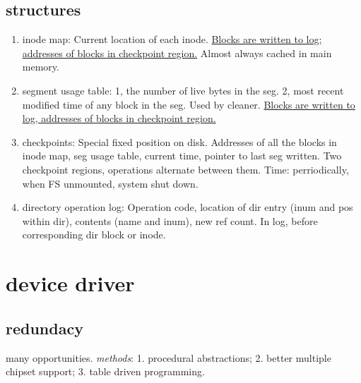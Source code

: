 \documentclass[9pt,conference]{IEEEtran}
\begin{document}
\subsection{structures}
\label{sec-6-1}
\begin{enumerate}
\item inode map:
\label{sec-6-1-1}
Current location of each inode.
\uline{Blocks are written to log; addresses of blocks in checkpoint region.}
Almost always cached in main memory.
\item segment usage table:
\label{sec-6-1-2}
1, the number of live bytes in the seg.
2, most recent modified time of any block in the seg.
Used by cleaner.
\uline{Blocks are written to log, addresses of blocks in checkpoint region.}
\item checkpoints:
\label{sec-6-1-3}
Special fixed position on disk.
Addresses of all the blocks in inode map, seg usage table, current time, pointer to last seg written.
Two checkpoint regions, operations alternate between them.
Time: perriodically, when FS unmounted, system shut down.
\item directory operation log:
\label{sec-6-1-4}
Operation code, location of dir entry (inum and pos within dir), contents (name and inum), new ref count.
In log, before corresponding dir block or inode.
\end{enumerate}

\section{device driver}
\label{sec-7}
\subsection{redundacy}
\label{sec-7-1}
many opportunities. \emph{methods}: 1. procedural abstractions; 2. better multiple chipset support; 3. table driven programming.
\end{document}
